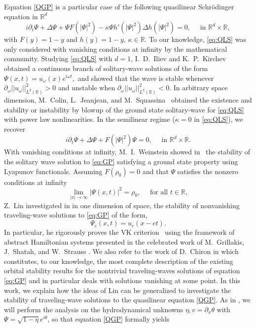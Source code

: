 \documentclass[11pt]{article}
\newcommand{\R}{\mathbb{R}}
\theoremstyle{plain}
\theoremstyle{definition}
\theoremstyle{remark}
\numberwithin{equation}{section}
\begin{document}
{	
	Equation \eqref{QGP} is a particular case of the following quasilinear Schr\"odinger equation in $\R^d$
	\begin{equation}\label{eq:QLS}
		i\partial_t\Psi+\Delta\Psi+\Psi F(|\Psi|^2)-\kappa\Psi h'(|\Psi|^2)\Delta h(|\Psi|^2)=0,\quad\text{ in }\R^d\times\R,
	\end{equation}
	with $F(y)=1-y$ and $h(y)=1-y$, $\kappa\in\R$. To our knowledge, \eqref{eq:QLS} was only considered with vanishing conditions at infinity by the mathematical community. 
	Studying \eqref{eq:QLS} with $d=1$,  I.~D.~Iliev and K.~P.~Kirchev~\cite{ilievquasilinstab} obtained a continuous branch of solitary-wave solutions of the form
	$\Psi(x,t)=u_\omega(x)e^{i\omega t},$ and showed that the wave is stable whenever $\partial_\omega||u_\omega||_{ L^2(\R)}^2>0$ and unstable when $\partial_\omega||u_\omega||_{ L^2(\R)}^2<0$.
	In arbitrary space dimension, M.~Colin, L.~Jeanjean, and M.~Squassina~\cite{Colin2} obtained the existence and stability or instability by blowup of the ground state solitary-wave for \eqref{eq:QLS} with power law nonlinearities.
	In the semilinear regime ($\kappa=0$ in \eqref{eq:QLS}), we recover
	\begin{equation}\label{eq:GP}
		i\partial_t\Psi+\Delta\Psi+F(|\Psi|^2)\Psi=0,\quad\text{ in }\R^d\times\R.
	\end{equation}
	With vanishing conditions at infinity, M.~I.~Weinstein showed in~\cite{weinstein} the stability of the solitary wave solution to \eqref{eq:GP} satisfying a ground state property using Lyapunov functionals.
	Assuming $F(\rho_0)=0$ and that $\Psi$ satisfies the nonzero conditions at infinity
	\begin{equation}\label{eq:nonzero2}
		\lim_{|x|\to\infty}|\Psi(x,t)|^2=\rho_0, \quad\text{ for all }t\in\R,
	\end{equation}
	Z.~Lin investigated in \cite{linbubbles} in one dimension of space, the stability of nonvanishing traveling-wave solutions to \eqref{eq:GP} of the form,
	\begin{equation}\label{Twans}
		\Psi_{c}(x,t)=u_{c}(x-ct).
	\end{equation}
	In particular, he rigorously proves the VK criterion~\cite{vakhitovcrit} using the framework of abstract Hamiltonian systems presented in the celebrated work of  M.~Grillakis, J.~Shatah, and W.~Strauss \cite{grillakisshatah}.
	We also refer to the work of D.~Chiron in \cite{chiron-stability} which constitutes, to our knowledge, the most complete description of the existing orbital stability results for the nontrivial traveling-waves solutions of equation \eqref{eq:GP} and in particular deals with solutions vanishing at some point. In this work, we explain how the ideas of Lin can be generalized to investigate the stability of traveling-wave solutions to the quasilinear equation \eqref{QGP}. As in \cite{linbubbles}, we will perform the analysis on the hydrodynamical unknowns $\eta, v=\partial_x\theta$ with $\Psi=\sqrt{1-\eta}e^{i\theta}$, so that equation \eqref{QGP} formally yields
}
\end{document}
